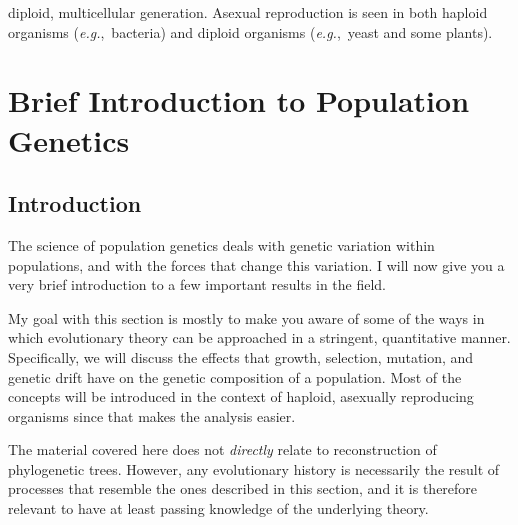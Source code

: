 \documentclass[11pt,a4paper]{book}
\newcommand{\eg}{\emph{e.g.},\ }
\begin{document}
diploid, multicellular generation. Asexual reproduction is seen in both haploid organisms (\eg bacteria) and diploid organisms (\eg yeast and some plants). 


\chapter{Brief Introduction to Population Genetics}
		\clearpage

\section{Introduction}

The science of population genetics deals with genetic variation within populations, and with the forces that change this variation. I will now give you a very brief introduction to a few important results in the field. 

My goal with this section is mostly to make you aware of some of the ways in which evolutionary theory can be approached in a stringent, quantitative manner.  Specifically, we will discuss the effects that growth, selection, mutation, and genetic drift have on the genetic composition of a population. Most of the concepts will be introduced in the context of haploid, asexually reproducing organisms since that makes the analysis easier.

The material covered here does not \emph{directly} relate to reconstruction of phylogenetic trees. However, any evolutionary history is necessarily the result of processes that resemble the ones described in this section, and it is therefore relevant to have at least passing knowledge of the underlying theory. 
%
\end{document}
